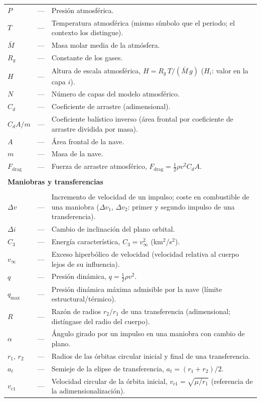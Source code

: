 \begin{longtable}{lcp{} }
$P$ & --- & Presión atmosférica.\\
$T$ & --- & Temperatura atmosférica (mismo símbolo que el periodo; el contexto los distingue).\\
$\bar{M}$ & --- & Masa molar media de la atmósfera.\\
$R_g$ & --- & Constante de los gases.\\
$H$ & --- & Altura de escala atmosférica, $H = R_g\,T/(\bar{M}\,g)$ ($H_i$: valor en la capa $i$).\\
$N$ & --- & Número de capas del modelo atmosférico.\\
$C_d$ & --- & Coeficiente de arrastre (adimensional).\\
$C_d A/m$ & --- & Coeficiente balístico inverso (área frontal por coeficiente de arrastre dividida por masa).\\
$A$ & --- & Área frontal de la nave.\\
$m$ & --- & Masa de la nave.\\
$F_{\text{drag}}$ & --- & Fuerza de arrastre atmosférico, $F_{\text{drag}}=\tfrac{1}{2}\rho v^2 C_d A$.\\
\\
\multicolumn{3}{l}{\textbf{Maniobras y transferencias}}\\
\\
$\Delta v$ & --- & Incremento de velocidad de un impulso; coste en combustible de una maniobra ($\Delta v_1$, $\Delta v_2$: primer y segundo impulso de una transferencia).\\
$\Delta i$ & --- & Cambio de inclinación del plano orbital.\\
$C_3$ & --- & Energía característica, $C_3=v_\infty^2$ (km$^2$/s$^2$).\\
$v_\infty$ & --- & Exceso hiperbólico de velocidad (velocidad relativa al cuerpo lejos de su influencia).\\
$q$ & --- & Presión dinámica, $q=\tfrac{1}{2}\rho v^2$.\\
$q_{\max}$ & --- & Presión dinámica máxima admisible por la nave (límite estructural/térmico).\\
$R$ & --- & Razón de radios $r_2/r_1$ de una transferencia (adimensional; distíngase del radio del cuerpo).\\
$\alpha$ & --- & Ángulo girado por un impulso en una maniobra con cambio de plano.\\
$r_1,\,r_2$ & --- & Radios de las órbitas circular inicial y final de una transferencia.\\
$a_t$ & --- & Semieje de la elipse de transferencia, $a_t=(r_1+r_2)/2$.\\
$v_{c1}$ & --- & Velocidad circular de la órbita inicial, $v_{c1}=\sqrt{\mu/r_1}$ (referencia de la adimensionalización).\\
\end{longtable}
